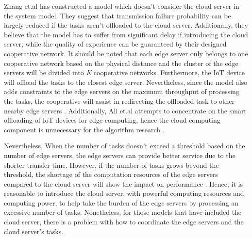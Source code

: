 \documentclass[a4paper,11pt]{article}
\begin{document}
Zhang et.al has constructed a model which doesn't consider the cloud server in the system model. They suggest that transmission failure probability can be largely reduced if the tasks aren't offloaded to the cloud server. Additionally, they believe that the model has to suffer from significant delay if introducing the cloud server, while the quality of experience can be guaranteed by their designed cooperative network. It should be noted that each edge server only belongs to one cooperative network based on the physical distance and the cluster of the edge servers will be divided into \textit{K} cooperative networks. Furthermore, the IoT device will offload the tasks to the closest edge server. Nevertheless, since the model also adds constraints to the edge servers on the maximum throughput of processing the tasks, the cooperative will assist in redirecting the offloaded task to other nearby edge servers \cite{no_cloud_1_density}. Additionally, Ali et.al attempts to concentrate on the smart offloading of IoT devices for edge computing, hence the cloud computing component is unnecessary for the algorithm research \cite{granuity_2}.\newline %

Nevertheless, When the number of tasks doesn't exceed a threshold based on the number of edge servers, the edge servers can provide better service due to the shorter transfer time. However, if the number of tasks grows beyond the threshold, the shortage of the computation resources of the edge servers compared to the cloud server will show the impact on performance \cite{A_Cooperative_Partial_Computation_Offloading_Scheme_for_Mobile_Edge}. Hence, it is reasonable to introduce the cloud server, with powerful computing resources and computing power, to help take the burden of the edge servers by processing an excessive number of tasks. Nonetheless, for those models that have included the cloud server, there is a problem with how to coordinate the edge servers and the cloud server's tasks. \newline
\end{document}
